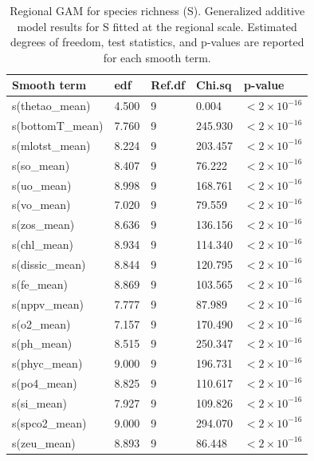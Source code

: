 \documentclass[a4paper,fleqn]{cas-sc}
\begin{document}
\begin{table}[width=.9\linewidth,cols=5,pos=!htbp]
\caption{Regional GAM for species richness (S). Generalized additive model results for S fitted at the regional scale. Estimated degrees of freedom, test statistics, and p-values are reported for each smooth term.}
\small
\begin{tabular*}{\tblwidth}{@{} LLLLL @{}}
\toprule
\textbf{Smooth term} & \textbf{edf} & \textbf{Ref.df} & \textbf{Chi.sq} & \textbf{p-value} \\
\midrule
s(thetao\_mean)      & 4.500 & 9 &   0.004 & $<2 \times 10^{-16}$ \\
s(bottomT\_mean) & 7.760 & 9 & 245.930 & $<2 \times 10^{-16}$ \\
s(mlotst\_mean)   & 8.224 & 9 & 203.457 & $<2 \times 10^{-16}$ \\
s(so\_mean)       & 8.407 & 9 &  76.222 & $<2 \times 10^{-16}$ \\
s(uo\_mean)       & 8.998 & 9 & 168.761 & $<2 \times 10^{-16}$ \\
s(vo\_mean)       & 7.020 & 9 &  79.559 & $<2 \times 10^{-16}$ \\
s(zos\_mean)      & 8.636 & 9 & 136.156 & $<2 \times 10^{-16}$ \\
s(chl\_mean)      & 8.934 & 9 & 114.340 & $<2 \times 10^{-16}$ \\
s(dissic\_mean)   & 8.844 & 9 & 120.795 & $<2 \times 10^{-16}$ \\
s(fe\_mean)       & 8.869 & 9 & 103.565 & $<2 \times 10^{-16}$ \\
s(nppv\_mean)     & 7.777 & 9 &  87.989 & $<2 \times 10^{-16}$ \\
s(o2\_mean)       & 7.157 & 9 & 170.490 & $<2 \times 10^{-16}$ \\
s(ph\_mean)       & 8.515 & 9 & 250.347 & $<2 \times 10^{-16}$ \\
s(phyc\_mean)     & 9.000 & 9 & 196.731 & $<2 \times 10^{-16}$ \\
s(po4\_mean)      & 8.825 & 9 & 110.617 & $<2 \times 10^{-16}$ \\
s(si\_mean)       & 7.927 & 9 & 109.826 & $<2 \times 10^{-16}$ \\
s(spco2\_mean)    & 9.000 & 9 & 294.070 & $<2 \times 10^{-16}$ \\
s(zeu\_mean)      & 8.893 & 9 &  86.448 & $<2 \times 10^{-16}$ \\
\bottomrule
\end{tabular*}
\label{tab:18}
\end{table}
\end{document}
